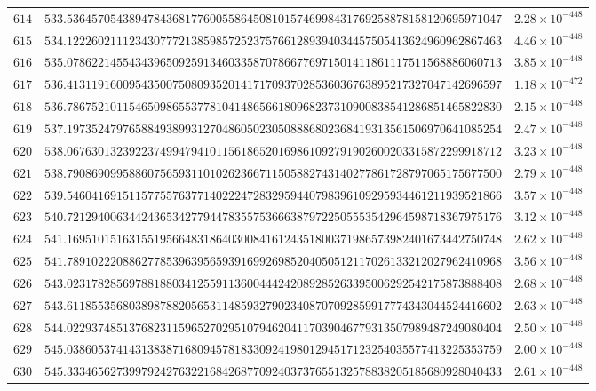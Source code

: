 \documentclass[12pt,reqno]{amsart}
\theoremstyle{remark}
\begin{document}
\begin{longtable}{clc}
$614$ & $533.5364570543894784368177600558645081015746998431769258878158120695971047$ & $2.28\times 10^{-448}$ \\
$615$ & $534.1222602111234307772138598572523757661289394034457505413624960962867463$ & $4.46\times 10^{-448}$ \\
$616$ & $535.0786221455434396509259134603358707866776971501411861117511568886060713$ & $3.85\times 10^{-448}$ \\
$617$ & $536.4131191600954350075080935201417170937028536036763895217327047142696597$ & $1.18\times 10^{-472}$ \\
$618$ & $536.7867521011546509865537781041486566180968237310900838541286851465822830$ & $2.15\times 10^{-448}$ \\
$619$ & $537.1973524797658849389931270486050230508886802368419313561506970641085254$ & $2.47\times 10^{-448}$ \\
$620$ & $538.0676301323922374994794101156186520169861092791902600203315872299918712$ & $3.23\times 10^{-448}$ \\
$621$ & $538.7908690995886075659311010262366711505882743140277861728797065175677500$ & $2.79\times 10^{-448}$ \\
$622$ & $539.5460416915115775576377140222472832959440798396109295934461211939521866$ & $3.57\times 10^{-448}$ \\
$623$ & $540.7212940063442436534277944783557536663879722505553542964598718367975176$ & $3.12\times 10^{-448}$ \\
$624$ & $541.1695101516315519566483186403008416124351800371986573982401673442750748$ & $2.62\times 10^{-448}$ \\
$625$ & $541.7891022208862778539639565939169926985204050512117026133212027962410968$ & $3.56\times 10^{-448}$ \\
$626$ & $543.0231782856978818803412559113600444242089285263395006292542175873888408$ & $2.68\times 10^{-448}$ \\
$627$ & $543.6118553568038987882056531148593279023408707092859917774343044524416602$ & $2.63\times 10^{-448}$ \\
$628$ & $544.0229374851376823115965270295107946204117039046779313507989487249080404$ & $2.50\times 10^{-448}$ \\
$629$ & $545.0386053741431383871680945781833092419801294517123254035577413225353759$ & $2.00\times 10^{-448}$ \\
$630$ & $545.3334656273997924276322168426877092403737655132578838205185680928040433$ & $2.61\times 10^{-448}$ \\

\end{longtable}
\end{document}
